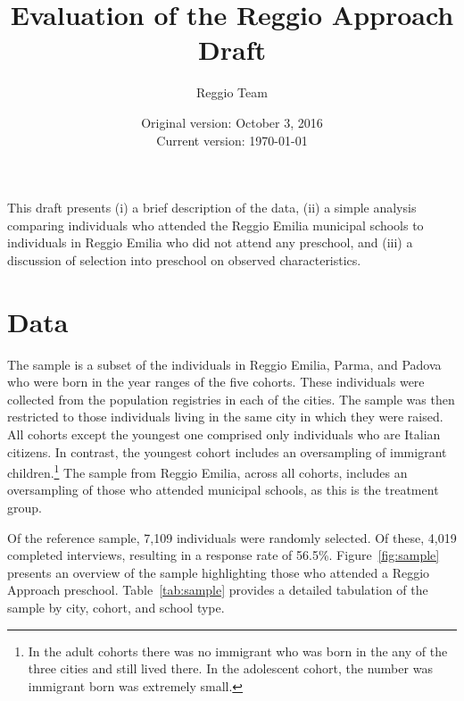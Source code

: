 


\usepackage{sectsty}
\sectionfont{\fontsize{14}{14}\selectfont}
\subsectionfont{\fontsize{13}{13}\selectfont}



\title{\normalsize \textbf{Evaluation of the Reggio Approach} \\ \normalsize Draft}
\author{\normalsize Reggio Team}
\date{\normalsize Original version: October 3, 2016 \\ Current version: \today}
\maketitle

\doublespacing

This draft presents (i) a brief description of the data, (ii) a simple analysis comparing individuals who attended the Reggio Emilia municipal schools to individuals in Reggio Emilia who did not attend any preschool, and (iii) a discussion of selection into preschool on observed characteristics. 

\section{Data}
\label{sec:data}

The sample is a subset of the individuals in Reggio Emilia, Parma, and Padova who were born in the year ranges of the five cohorts.  These individuals were collected from the population registries in each of the cities. The sample was then restricted to those individuals living in the same city in which they were raised. All cohorts except the youngest one comprised only individuals who are Italian citizens. In contrast, the youngest cohort includes an oversampling of immigrant children.\footnote{In the adult cohorts there was no immigrant who was born in the any of the three cities and still lived there. In the adolescent cohort, the number was immigrant born was extremely small.} The sample from Reggio Emilia, across all cohorts, includes an oversampling of those who attended municipal schools, as this is the treatment group.

Of the reference sample, 7,109 individuals were randomly selected. Of these, 4,019 completed interviews, resulting in a response rate of 56.5\%. Figure~\ref{fig:sample} presents an overview of the sample highlighting those who attended a Reggio Approach preschool. Table~\ref{tab:sample} provides a detailed tabulation of the sample by city, cohort, and school type.

